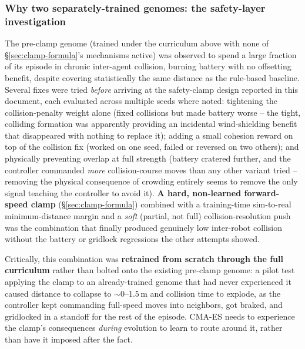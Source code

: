 \documentclass[11pt]{article}
\begin{document}
\subsubsection{Why two separately-trained genomes: the safety-layer investigation}
\label{sec:why-two-genomes}
The pre-clamp genome (trained under the curriculum above with none of \S\ref{sec:clamp-formula}'s
mechanisms active) was observed to spend a large fraction of its episode in chronic inter-agent
collision, burning battery with no offsetting benefit, despite covering statistically the same
distance as the rule-based baseline. Several fixes were tried \emph{before} arriving at the
safety-clamp design reported in this document, each evaluated across multiple seeds where noted:
tightening the collision-penalty weight alone (fixed collisions but made battery worse -- the
tight, colliding formation was apparently providing an incidental wind-shielding benefit that
disappeared with nothing to replace it); adding a small cohesion reward on top of the collision
fix (worked on one seed, failed or reversed on two others); and physically preventing overlap at
full strength (battery cratered further, and the controller commanded \emph{more} collision-course
moves than any other variant tried -- removing the physical consequence of crowding entirely
seems to remove the only signal teaching the controller to avoid it). \textbf{A hard, non-learned
forward-speed clamp} (\S\ref{sec:clamp-formula}) combined with a training-time sim-to-real
minimum-distance margin and a \emph{soft} (partial, not full) collision-resolution push was the
combination that finally produced genuinely low inter-robot collision without the battery or
gridlock regressions the other attempts showed.

Critically, this combination was \textbf{retrained from scratch through the full curriculum}
rather than bolted onto the existing pre-clamp genome: a pilot test applying the clamp to an
already-trained genome that had never experienced it caused distance to collapse to
$\sim$0--1.5\,m and collision time to explode, as the controller kept commanding full-speed
moves into neighbors, got braked, and gridlocked in a standoff for the rest of the episode.
CMA-ES needs to experience the clamp's consequences \emph{during} evolution to learn to route
around it, rather than have it imposed after the fact.
\end{document}
